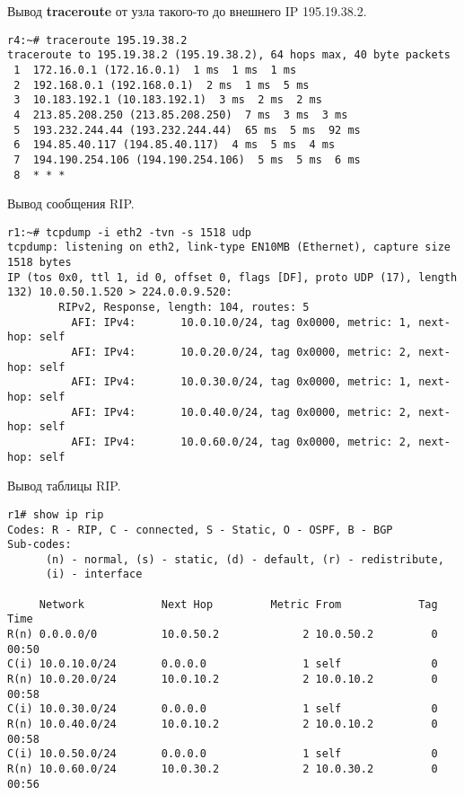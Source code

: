 \documentclass[a4paper,12pt]{article}
\begin{document}
Вывод \textbf{traceroute} от узла такого-то до внешнего IP 195.19.38.2.

\begin{Verbatim}
r4:~# traceroute 195.19.38.2
traceroute to 195.19.38.2 (195.19.38.2), 64 hops max, 40 byte packets
 1  172.16.0.1 (172.16.0.1)  1 ms  1 ms  1 ms
 2  192.168.0.1 (192.168.0.1)  2 ms  1 ms  5 ms
 3  10.183.192.1 (10.183.192.1)  3 ms  2 ms  2 ms
 4  213.85.208.250 (213.85.208.250)  7 ms  3 ms  3 ms
 5  193.232.244.44 (193.232.244.44)  65 ms  5 ms  92 ms
 6  194.85.40.117 (194.85.40.117)  4 ms  5 ms  4 ms
 7  194.190.254.106 (194.190.254.106)  5 ms  5 ms  6 ms
 8  * * *
\end{Verbatim}

Вывод сообщения RIP.

\begin{Verbatim}
r1:~# tcpdump -i eth2 -tvn -s 1518 udp
tcpdump: listening on eth2, link-type EN10MB (Ethernet), capture size 1518 bytes
IP (tos 0x0, ttl 1, id 0, offset 0, flags [DF], proto UDP (17), length 132) 10.0.50.1.520 > 224.0.0.9.520:
        RIPv2, Response, length: 104, routes: 5
          AFI: IPv4:       10.0.10.0/24, tag 0x0000, metric: 1, next-hop: self
          AFI: IPv4:       10.0.20.0/24, tag 0x0000, metric: 2, next-hop: self
          AFI: IPv4:       10.0.30.0/24, tag 0x0000, metric: 1, next-hop: self
          AFI: IPv4:       10.0.40.0/24, tag 0x0000, metric: 2, next-hop: self
          AFI: IPv4:       10.0.60.0/24, tag 0x0000, metric: 2, next-hop: self
\end{Verbatim}

Вывод таблицы RIP.

\begin{Verbatim}
r1# show ip rip
Codes: R - RIP, C - connected, S - Static, O - OSPF, B - BGP
Sub-codes:
      (n) - normal, (s) - static, (d) - default, (r) - redistribute,
      (i) - interface

     Network            Next Hop         Metric From            Tag Time
R(n) 0.0.0.0/0          10.0.50.2             2 10.0.50.2         0 00:50
C(i) 10.0.10.0/24       0.0.0.0               1 self              0
R(n) 10.0.20.0/24       10.0.10.2             2 10.0.10.2         0 00:58
C(i) 10.0.30.0/24       0.0.0.0               1 self              0
R(n) 10.0.40.0/24       10.0.10.2             2 10.0.10.2         0 00:58
C(i) 10.0.50.0/24       0.0.0.0               1 self              0
R(n) 10.0.60.0/24       10.0.30.2             2 10.0.30.2         0 00:56
\end{Verbatim}
\end{document}
